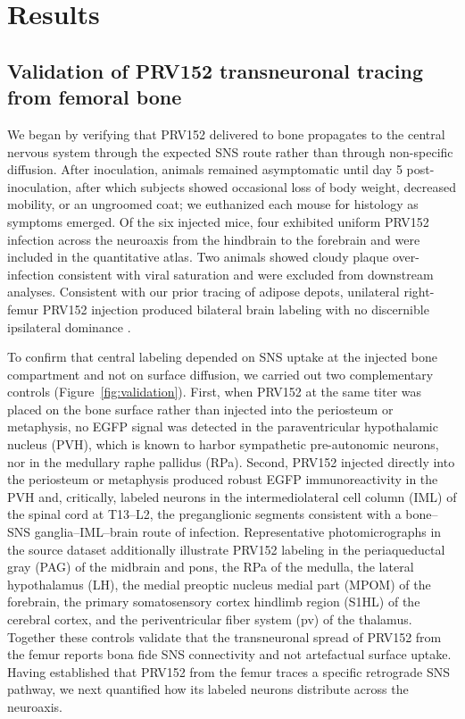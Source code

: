 \documentclass[11pt]{article}
\begin{document}
\section{Results}\label{sec:results}

\subsection{Validation of PRV152 transneuronal tracing from femoral bone}

We began by verifying that PRV152 delivered to bone propagates to the central nervous system through the expected SNS route rather than through non-specific diffusion. After inoculation, animals remained asymptomatic until day 5 post-inoculation, after which subjects showed occasional loss of body weight, decreased mobility, or an ungroomed coat; we euthanized each mouse for histology as symptoms emerged. Of the six injected mice, four exhibited uniform PRV152 infection across the neuroaxis from the hindbrain to the forebrain and were included in the quantitative atlas. Two animals showed cloudy plaque over-infection consistent with viral saturation and were excluded from downstream analyses. Consistent with our prior tracing of adipose depots, unilateral right-femur PRV152 injection produced bilateral brain labeling with no discernible ipsilateral dominance \citep{bamshad1998central,bartness1998innervation,ryu2014short}.

To confirm that central labeling depended on SNS uptake at the injected bone compartment and not on surface diffusion, we carried out two complementary controls (Figure~\ref{fig:validation}). First, when PRV152 at the same titer was placed on the bone surface rather than injected into the periosteum or metaphysis, no EGFP signal was detected in the paraventricular hypothalamic nucleus (PVH), which is known to harbor sympathetic pre-autonomic neurons, nor in the medullary raphe pallidus (RPa). Second, PRV152 injected directly into the periosteum or metaphysis produced robust EGFP immunoreactivity in the PVH and, critically, labeled neurons in the intermediolateral cell column (IML) of the spinal cord at T13--L2, the preganglionic segments consistent with a bone--SNS ganglia--IML--brain route of infection. Representative photomicrographs in the source dataset additionally illustrate PRV152 labeling in the periaqueductal gray (PAG) of the midbrain and pons, the RPa of the medulla, the lateral hypothalamus (LH), the medial preoptic nucleus medial part (MPOM) of the forebrain, the primary somatosensory cortex hindlimb region (S1HL) of the cerebral cortex, and the periventricular fiber system (pv) of the thalamus. Together these controls validate that the transneuronal spread of PRV152 from the femur reports bona fide SNS connectivity and not artefactual surface uptake. Having established that PRV152 from the femur traces a specific retrograde SNS pathway, we next quantified how its labeled neurons distribute across the neuroaxis.
\end{document}
